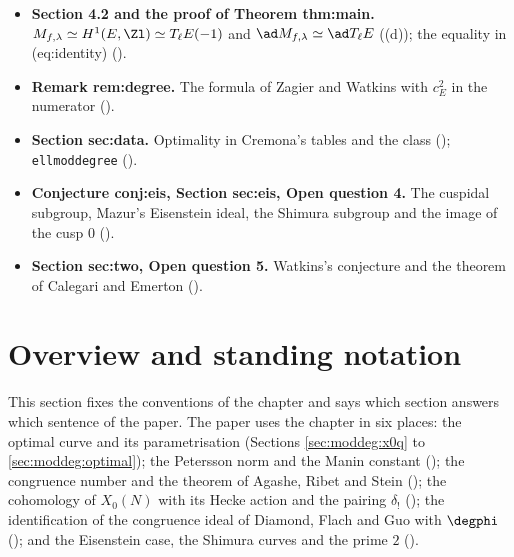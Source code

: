 \begin{itemize}
\item \textbf{Section 4.2 and the proof of Theorem thm:main.} $M_{f,\lambda}\simeq H^1(E,\Zl)\simeq T_\ell E(-1)$ and $\ad M_{f,\lambda}\simeq\ad T_\ell E$
((d)); the equality in (eq:identity) ().
\item \textbf{Remark rem:degree.} The formula of Zagier and Watkins with $c_E^2$ in the numerator ().
\item \textbf{Section sec:data.} Optimality in Cremona's tables and the class  (); \texttt{ellmoddegree}
().
\item \textbf{Conjecture conj:eis, Section sec:eis, Open question 4.} The cuspidal subgroup, Mazur's Eisenstein ideal, the Shimura subgroup and
the image of the cusp $0$ ().
\item \textbf{Section sec:two, Open question 5.} Watkins's conjecture and the theorem of Calegari and Emerton ().
\end{itemize}

\section{Overview and standing notation}\label{sec:moddeg:overview}

This section fixes the conventions of the chapter and says which section answers which sentence of the paper. The paper
uses the chapter in six places: the optimal curve and its parametrisation (Sections \ref{sec:moddeg:x0q} to \ref{sec:moddeg:optimal}); the
Petersson norm and the Manin constant (); the congruence number and the theorem of Agashe, Ribet and Stein
(); the cohomology of $X_0(N)$ with its Hecke action and the pairing $\hat\delta_!$ ();
the identification of the congruence ideal of Diamond, Flach and Guo with $\degphi$ (); and the Eisenstein
case, the Shimura curves and the prime $2$ ().

